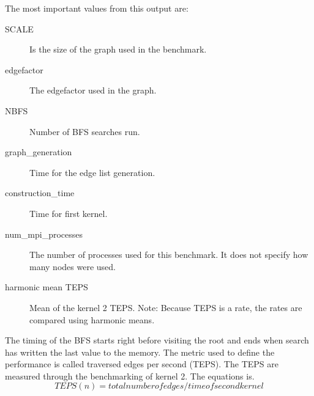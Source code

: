 The most important values from this output are:
\begin{description}
\item[SCALE] Is the size of the graph used in the benchmark.
\item[edgefactor] The edgefactor used in the graph.
\item[NBFS] Number of BFS searches run.
\item[graph\_generation] Time for the edge list generation.
\item[construction\_time] Time for first kernel.
\item[num\_mpi\_processes] The number of processes used for this benchmark. It does not specify how many nodes were used.
\item[harmonic mean TEPS] Mean  of the kernel 2 TEPS. Note: Because TEPS is a rate, the rates are compared using harmonic means\cite{harmonic_mean}.
\end{description}

The timing of the BFS starts right before visiting the root and ends when search has written the last value to the memory. The metric used to define the performance is called traversed edges per second (TEPS). The TEPS are measured through the benchmarking of kernel 2. The equations is.
\begin{equation}
TEPS(n) = total number of edges / time of second kernel
\end{equation}








